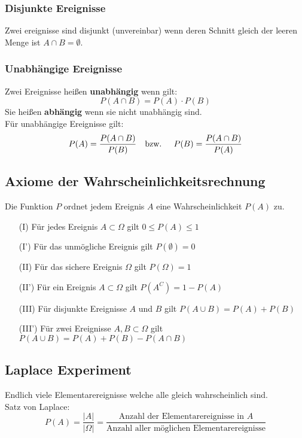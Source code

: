 \documentclass[12pt]{article}
\begin{document}
\subsubsection{Disjunkte Ereignisse}
Zwei ereignisse sind disjunkt (unvereinbar) wenn deren Schnitt gleich der leeren Menge ist $A \cap B = \emptyset$.
\subsubsection{Unabhängige Ereignisse}
Zwei Ereignisse heißen \textbf{unabhängig} wenn gilt: 
\begin{equation*}
	P(A\cap B) = P(A) \cdot P(B)
\end{equation*}
Sie heißen \textbf{abhängig} wenn sie nicht unabhängig sind.\\
Für unabhängige Ereignisse gilt:
\begin{equation*}
	P(A) = \frac{P(A\cap B)}{P(B)} \text{\quad bzw. \quad} P(B)=\frac{P(A\cap B)}{P(A)}
\end{equation*} 
\subsection{Axiome der Wahrscheinlichkeitsrechnung}
Die Funktion $P$ ordnet jedem Ereignis $A$ eine Wahrscheinlichkeit $P(A)$ zu.
\begin{enumerate}
	\item[(I)] Für jedes Ereignis $A\subset \Omega$ gilt $0\leq P(A) \leq 1$
	\item[(I')] Für das unmögliche Ereignis gilt $P(\emptyset) = 0$
	\item[(II)] Für das sichere Ereignis $\Omega$ gilt $P(\Omega) = 1$
	\item[(II')] Für ein Ereignis $A \subset \Omega$ gilt $P(A^C) = 1- P(A)$
	\item[(III)] Für disjunkte Ereignisse $A$ und $B$ gilt $P(A\cup B) = P(A)+P(B)$ 
	\item[(III')] Für zwei Ereignisse $A,B \subset \Omega$ gilt $P(A\cup B)= P(A)+P(B)-P(A\cap B)$ 
\end{enumerate}
\subsection{Laplace Experiment}
Endlich viele Elementarereignisse welche alle gleich wahrscheinlich sind.\\
Satz von Laplace:
\begin{equation*}
	P(A) = \frac{|A|}{|\Omega|}=\frac{\text{Anzahl der Elementarereignisse in $A$}}{\text{Anzahl aller möglichen Elementarereignisse}}
\end{equation*}
\end{document}
